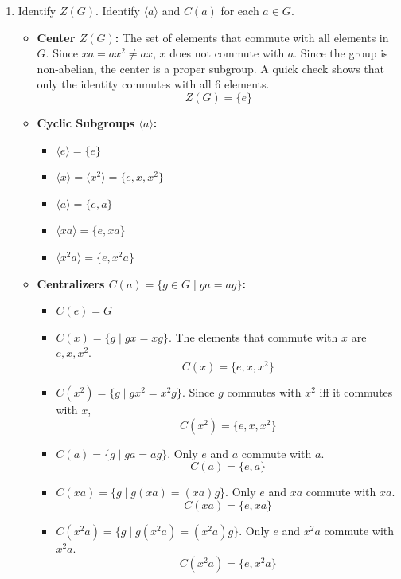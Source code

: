 \begin{enumerate}
\begin{enumerate}
    \item Identify $Z(G)$. Identify $\langle a \rangle$ and $C(a)$ for each $a \in G$.
    \begin{subanswer}
      \begin{itemize}
        \item \textbf{Center $Z(G)$:} The set of elements that commute with all 
        elements in $G$. Since $xa = ax^2 \neq ax$, $x$ does not commute with 
        $a$. Since the group is non-abelian, the center is a proper subgroup. 
        A quick check shows that only the identity commutes with all 6 elements.
          \[ Z(G) = \{e\} \]
        \item \textbf{Cyclic Subgroups $\langle a \rangle$:}
          \begin{itemize}
            \item $\langle e \rangle = \{e\}$
            \item $\langle x \rangle = \langle x^2 \rangle = \{e, x, x^2\}$
            \item $\langle a \rangle = \{e, a\}$
            \item $\langle xa \rangle = \{e, xa\}$
            \item $\langle x^2a \rangle = \{e, x^2a\}$
          \end{itemize}
        \item \textbf{Centralizers $C(a) = \{g \in G \mid ga = ag\}$:}
          \begin{itemize}
            \item $C(e) = G$
            \item $C(x) = \{g \mid gx = xg\}$. The elements that commute with $x$ are $e, x, x^2$.
              \[ C(x) = \{e, x, x^2\} \]
            \item $C(x^2) = \{g \mid gx^2 = x^2g\}$. Since $g$ commutes with $x^2$ iff it commutes with $x$,
              \[ C(x^2) = \{e, x, x^2\} \]
            \item $C(a) = \{g \mid ga = ag\}$. Only $e$ and $a$ commute with $a$.
              \[ C(a) = \{e, a\} \]
            \item $C(xa) = \{g \mid g(xa) = (xa)g\}$. Only $e$ and $xa$ commute with $xa$.
              \[ C(xa) = \{e, xa\} \]
            \item $C(x^2a) = \{g \mid g(x^2a) = (x^2a)g\}$. Only $e$ and $x^2a$ commute with $x^2a$.
              \[ C(x^2a) = \{e, x^2a\} \]
          \end{itemize}
      \end{itemize}
    \end{subanswer}


\end{enumerate}
\end{enumerate}
